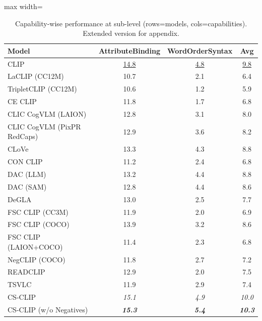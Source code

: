 \begin{table}[t]
  \centering
  \scriptsize
  \caption{Capability-wise performance at sub-level (rows=models, cols=capabilities). Extended version for appendix.}
  \label{tab:caps_sub_part2}
  \begin{adjustbox}{max width=\textwidth}
  \setlength{\tabcolsep}{2pt}
  \begin{tabular}{p{5.0cm}ccc}
    \toprule
    Model & AttributeBinding & WordOrderSyntax & Avg \\
    \midrule
    CLIP & \underline{14.8} & \underline{4.8} & \underline{9.8} \\
    \midrule
    LaCLIP (CC12M) & 10.7 & 2.1 & 6.4 \\
    TripletCLIP (CC12M) & 10.6 & 1.2 & 5.9 \\
    \midrule
    CE CLIP & 11.8 & 1.7 & 6.8 \\
    CLIC CogVLM (LAION) & 12.8 & 3.1 & 8.0 \\
    CLIC CogVLM (PixPR RedCaps) & 12.9 & 3.6 & 8.2 \\
    CLoVe & 13.3 & 4.3 & 8.8 \\
    CON CLIP & 11.2 & 2.4 & 6.8 \\
    DAC (LLM) & 13.2 & 4.4 & 8.8 \\
    DAC (SAM) & 12.8 & 4.4 & 8.6 \\
    DeGLA & 13.0 & 2.5 & 7.7 \\
    FSC CLIP (CC3M) & 11.9 & 2.0 & 6.9 \\
    FSC CLIP (COCO) & 13.9 & 3.2 & 8.6 \\
    FSC CLIP (LAION+COCO) & 11.4 & 2.3 & 6.8 \\
    NegCLIP (COCO) & 11.8 & 2.7 & 7.2 \\
    READCLIP & 12.9 & 2.0 & 7.5 \\
    TSVLC & 11.9 & 2.9 & 7.4 \\
    \midrule
    CS-CLIP & \emph{15.1} & \emph{4.9} & \emph{10.0} \\
    CS-CLIP (w/o Negatives) & \textbf{\emph{15.3}} & \textbf{\emph{5.4}} & \textbf{\emph{10.3}} \\
    \bottomrule
  \end{tabular}
  \end{adjustbox}
\end{table}

